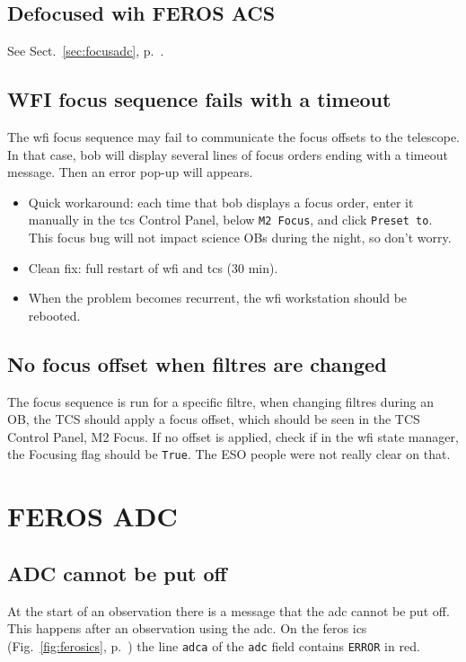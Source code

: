 \documentclass[11pt,fleqn]{book}
\def\figref#1{Fig.~\ref{fig:#1}, p.~\pageref{fig:#1}}
\def\secref#1{Sect.~\ref{sec:#1}, p.~\pageref{sec:#1}}
\begin{document}
\subsection{Defocused wih FEROS ACS}

See \secref{focusadc}.

\subsection{WFI focus sequence fails with a timeout}
\label{sec:wfifocseq}
The \gls{wfi} focus sequence may fail to communicate the focus offsets to the telescope.  In that case, \gls{bob} will display several lines of focus orders ending with a timeout message. Then an error pop-up will appears.

\begin{itemize}
   \item Quick workaround: each time that \gls{bob} displays a focus order, enter it manually in the \gls{tcs} Control Panel, below \texttt{M2 Focus}, and click \texttt{Preset to}.  This focus bug will not impact science OBs during the night, so don't worry.
   \item Clean fix: full restart of \gls{wfi} and \gls{tcs} (30 min).
   \item When the problem becomes recurrent, the \gls{wfi} workstation should
be rebooted.
\end{itemize}

\subsection{No focus offset when filtres are changed}
\label{sec:filfocoffset}
The focus sequence is run for a specific filtre, when changing filtres during an OB, the TCS should apply a focus offset, which should be seen in the TCS Control Panel, M2 Focus. If no offset is applied, check if in the \gls{wfi} state manager, the Focusing flag should be \texttt{True}. The ESO people were not really clear on that.


\section{FEROS ADC}

\subsection{ADC cannot be put off}

At the start of an observation there is a message that the \gls{adc} cannot be
put off.  This happens after an observation using the \gls{adc}.  On the 
\gls{feros} \gls{ics} (\figref{ferosics}) the line \texttt{adca} of the
\texttt{adc} field contains \texttt{ERROR} in red.  
\end{document}
